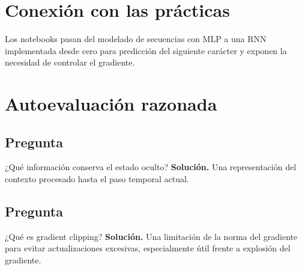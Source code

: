 \section{Conexión con las prácticas}

Los notebooks pasan del modelado de secuencias con MLP a una RNN implementada desde cero para predicción del siguiente carácter y exponen la necesidad de controlar el gradiente.


\section{Autoevaluación razonada}

\subsection*{Pregunta} ¿Qué información conserva el estado oculto?
\textbf{Solución.} Una representación del contexto procesado hasta el paso temporal actual.

\subsection*{Pregunta} ¿Qué es gradient clipping?
\textbf{Solución.} Una limitación de la norma del gradiente para evitar actualizaciones excesivas, especialmente útil frente a explosión del gradiente.
